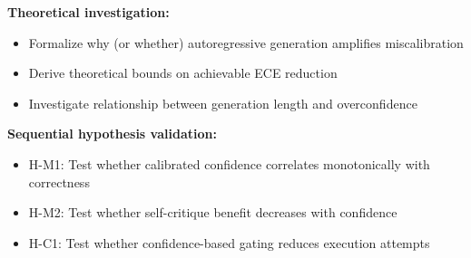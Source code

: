 \textbf{Theoretical investigation:}
\begin{itemize}
\item Formalize why (or whether) autoregressive generation amplifies miscalibration
\item Derive theoretical bounds on achievable ECE reduction
\item Investigate relationship between generation length and overconfidence
\end{itemize}

\textbf{Sequential hypothesis validation:}
\begin{itemize}
\item H-M1: Test whether calibrated confidence correlates monotonically with correctness
\item H-M2: Test whether self-critique benefit decreases with confidence
\item H-C1: Test whether confidence-based gating reduces execution attempts
\end{itemize}
